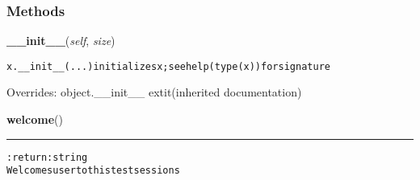   \subsubsection{Methods}

    \vspace{0.5ex}

\hspace{.8\funcindent}\begin{boxedminipage}{\funcwidth}

    \raggedright \textbf{\_\_init\_\_}(\textit{self}, \textit{size})

\setlength{\parskip}{2ex}
\begin{alltt}
x.\_\_init\_\_(...) initializes x; see help(type(x)) for signature
\end{alltt}

\setlength{\parskip}{1ex}
      Overrides: object.\_\_init\_\_ 	extit{(inherited documentation)}

    \end{boxedminipage}

    \label{hal:profile:performance:EightQueenTest:welcome}

    \vspace{0.5ex}

\hspace{.8\funcindent}\begin{boxedminipage}{\funcwidth}

    \raggedright \textbf{welcome}()

    \vspace{-1.5ex}

    \rule{\textwidth}{0.5\fboxrule}
\setlength{\parskip}{2ex}
\begin{alltt}

:return: string
    Welcomes user to this test sessions
\end{alltt}

\setlength{\parskip}{1ex}
    \end{boxedminipage}

    \label{hal:profile:performance:EightQueenTest:introduction}

